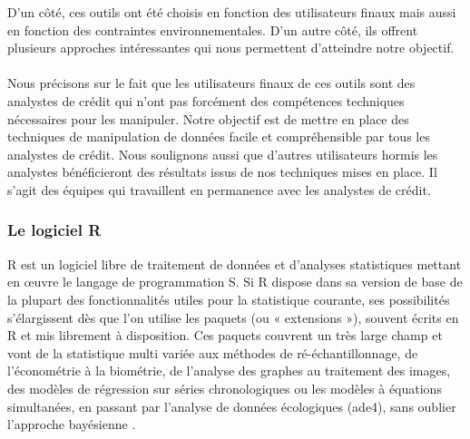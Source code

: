 \documentclass[11pt,a4paper]{report}
\begin{document}
D'un côté, ces outils ont été choisis en fonction des utilisateurs finaux mais aussi en fonction des contraintes environnementales. D'un autre côté, ils offrent plusieurs approches intéressantes qui nous permettent d'atteindre notre objectif.  \\\\
Nous précisons sur le fait que les utilisateurs finaux de ces outils sont des analystes de crédit qui n'ont pas forcément des compétences techniques nécessaires pour les manipuler. Notre objectif est de mettre en place des techniques de manipulation de données facile et compréhensible par tous les analystes de crédit. Nous soulignons aussi que d'autres utilisateurs hormis les analystes bénéficieront des résultats issus de nos techniques mises en place. Il s'agit des équipes qui travaillent en permanence  avec les analystes de crédit.  

\subsubsection{Le logiciel R}
R est un logiciel libre de traitement de données et d'analyses statistiques mettant en œuvre le langage de programmation S. 
Si R dispose dans sa version de base de la plupart des fonctionnalités utiles pour la statistique courante, ses possibilités s'élargissent dès que l'on utilise les paquets (ou « extensions »), souvent écrits en R et mis librement à disposition. Ces paquets couvrent un très large champ et vont de la statistique multi variée aux méthodes de ré-échantillonnage, de l'économétrie à la biométrie, de l'analyse des graphes au traitement des images, des modèles de régression sur séries chronologiques ou les modèles à équations simultanées, en passant par l'analyse de données écologiques (ade4), sans oublier l'approche bayésienne \cite{r}. 


%
%
\end{document}
